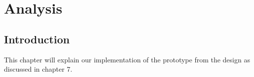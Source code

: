 \chapter{Analysis}
\section{Introduction}
This chapter will explain our implementation of the prototype from the design as discussed in chapter 7.


